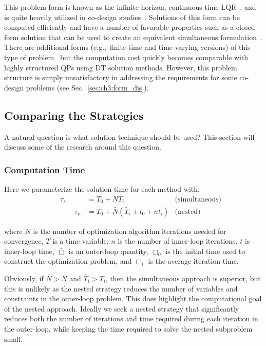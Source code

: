 \noindent This problem form is known as the infinite-horizon, continuous-time LQR~\cite{Liberzon2012a, Belvin1990a, Rao1988a}, and is quite heavily utilized in co-design studies~\cite{Rao1988a, Belvin1990a, Eastep1987a, Fathy2003a, Sunar1993a}.
Solutions of this form can be computed efficiently and have a number of favorable properties such as a closed-form solution that can be used to create an equivalent simultaneous formulation~\cite{Fathy2001a}. 
There are additional forms (e.g.,~finite-time and time-varying versions) of this type of problem~\cite{Bryson1975a, Liberzon2012a} but the computation cost quickly becomes comparable with highly structured QPs using DT solution methods. %
However, this problem structure is simply unsatisfactory in addressing the requirements for some co-design problems (see Sec.~\ref{sec:ch3:form_dis}). 

\subsection{Comparing the Strategies}

A natural question is what solution technique should be used? This section will discuss some of the research around this question.

\subsubsection{Computation Time}

Here we parameterize the solution time for each method with:
\begin{subequations}
\begin{align}
\qquad \tau_s &= T_{0} + N T_{i} &\text{(simultaneous)} \\
 \qquad  \qquad \tau_n &= T_{0} + \bar{N} \left( \bar{T}_{i} + t_{0} + n t_{i} \right)  &\text{(nested)}
\end{align}
\end{subequations}

\noindent where $N$ is the number of optimization algorithm iterations needed for convergence, $T$ is a time variable, $n$ is the number of inner-loop iterations, $t$ is inner-loop time, $\bar{\Box}$ is an outer-loop quantity, $\Box_0$ is the initial time used to construct the optimization problem, and $\Box_i$ is the average iteration time.

Obviously, if $\bar{N} > N$ and $\bar{T}_i > T_i$, then the simultaneous approach is superior, but this is unlikely as the nested strategy reduces the number of variables and constraints in the outer-loop problem.
This does highlight the computational goal of the nested approach.
Ideally we seek a nested strategy that significantly reduces both the number of iterations and time required during each iteration in the outer-loop, while keeping the time required to solve the nested subproblem small.

